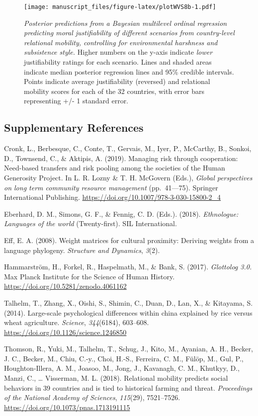 \documentclass[english,man,floatsintext]{apa6}
\begin{document}
\begin{figure}
\centering
\texttt{[image: manuscript\_files/figure-latex/plotWVS8b-1.pdf]}
\caption{\label{fig:plotWVS8b}\emph{Posterior predictions from a Bayesian multilevel ordinal regression predicting moral justifiability of different scenarios from country-level relational mobility, controlling for environmental harshness and subsistence style.} Higher numbers on the y-axis indicate \emph{lower} justifiability ratings for each scenario. Lines and shaded areas indicate median posterior regression lines and 95\% credible intervals. Points indicate average justifiability (reversed) and relational mobility scores for each of the 32 countries, with error bars representing +/- 1 standard error.}
\end{figure}

\newpage

\hypertarget{supplementary-references}{%
\subsection{Supplementary References}\label{supplementary-references}}

Cronk, L., Berbesque, C., Conte, T., Gervais, M., Iyer, P., McCarthy, B., Sonkoi, D., Townsend, C., \& Aktipis, A. (2019). Managing risk through cooperation: Need-based transfers and risk pooling among the societies of the Human Generosity Project. In L. R. Lozny \& T. H. McGovern (Eds.), \emph{Global perspectives on long term community resource management} (pp.~41---75). Springer International Publishing. \url{https://doi.org/10.1007/978-3-030-15800-2_4}

Eberhard, D. M., Simons, G. F., \& Fennig, C. D. (Eds.). (2018). \emph{Ethnologue: Languages of the world} (Twenty-first). SIL International.

Eff, E. A. (2008). Weight matrices for cultural proximity: Deriving weights from a language phylogeny. \emph{Structure and Dynamics}, \emph{3}(2).

Hammarström, H., Forkel, R., Haspelmath, M., \& Bank, S. (2017). \emph{Glottolog 3.0.} Max Planck Institute for the Science of Human History. \url{https://doi.org/10.5281/zenodo.4061162}

Talhelm, T., Zhang, X., Oishi, S., Shimin, C., Duan, D., Lan, X., \& Kitayama, S. (2014). Large-scale psychological differences within china explained by rice versus wheat agriculture. \emph{Science}, \emph{344}(6184), 603--608. \url{https://doi.org/10.1126/science.1246850}

Thomson, R., Yuki, M., Talhelm, T., Schug, J., Kito, M., Ayanian, A. H., Becker, J. C., Becker, M., Chiu, C.-y., Choi, H.-S., Ferreira, C. M., Fülöp, M., Gul, P., Houghton-Illera, A. M., Joasoo, M., Jong, J., Kavanagh, C. M., Khutkyy, D., Manzi, C., \ldots{} Visserman, M. L. (2018). Relational mobility predicts social behaviors in 39 countries and is tied to historical farming and threat. \emph{Proceedings of the National Academy of Sciences}, \emph{115}(29), 7521--7526. \url{https://doi.org/10.1073/pnas.1713191115}
\end{document}
